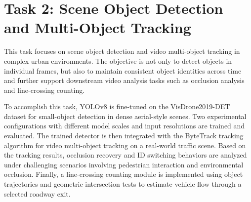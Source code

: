 \section{Task 2: Scene Object Detection and Multi-Object Tracking}

This task focuses on scene object detection and video multi-object tracking in complex urban environments. The objective is not only to detect objects in individual frames, but also to maintain consistent object identities across time and further support downstream video analysis tasks such as occlusion analysis and line-crossing counting.

To accomplish this task, YOLOv8 is fine-tuned on the VisDrone2019-DET dataset for small-object detection in dense aerial-style scenes. Two experimental configurations with different model scales and input resolutions are trained and evaluated. The trained detector is then integrated with the ByteTrack tracking algorithm for video multi-object tracking on a real-world traffic scene. Based on the tracking results, occlusion recovery and ID switching behaviors are analyzed under challenging scenarios involving pedestrian interaction and environmental occlusion. Finally, a line-crossing counting module is implemented using object trajectories and geometric intersection tests to estimate vehicle flow through a selected roadway exit.









